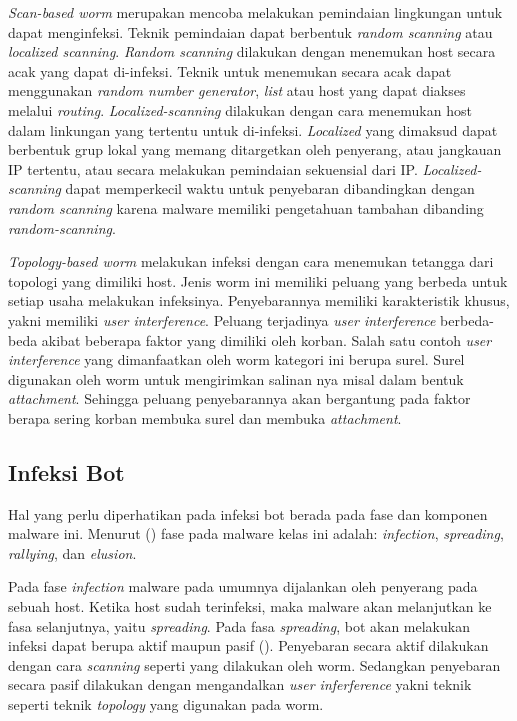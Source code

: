 \textit{Scan-based worm} merupakan mencoba melakukan pemindaian lingkungan untuk dapat menginfeksi. Teknik pemindaian dapat berbentuk \textit{random scanning} atau \textit{localized scanning}. \textit{Random scanning} dilakukan dengan menemukan host secara acak yang dapat di-infeksi. Teknik untuk menemukan secara acak dapat menggunakan \textit{random number generator}, \textit{list} atau host yang dapat diakses melalui \textit{routing}. \textit{Localized-scanning} dilakukan dengan cara menemukan host dalam linkungan yang tertentu untuk di-infeksi. \textit{Localized} yang dimaksud dapat berbentuk grup lokal yang memang ditargetkan oleh penyerang, atau jangkauan IP tertentu, atau secara melakukan pemindaian sekuensial dari IP. \textit{Localized-scanning} dapat memperkecil waktu untuk penyebaran dibandingkan dengan \textit{random scanning} karena malware memiliki pengetahuan tambahan dibanding \textit{random-scanning}.

\textit{Topology-based worm} melakukan infeksi dengan cara menemukan tetangga dari topologi yang dimiliki host. Jenis worm ini memiliki peluang yang berbeda untuk setiap usaha melakukan infeksinya. Penyebarannya memiliki karakteristik khusus, yakni memiliki \textit{user interference}. Peluang terjadinya \textit{user interference} berbeda-beda akibat beberapa faktor yang dimiliki oleh korban. Salah satu contoh \textit{user interference} yang dimanfaatkan oleh worm kategori ini berupa surel. Surel digunakan oleh worm untuk mengirimkan salinan nya misal dalam bentuk \textit{attachment}. Sehingga peluang penyebarannya akan bergantung pada faktor berapa sering korban membuka surel dan membuka \textit{attachment}.

\subsection{Infeksi Bot}

Hal yang perlu diperhatikan pada infeksi bot berada pada fase dan komponen malware ini. Menurut (\cite{alsamer2016}) fase pada malware kelas ini adalah: \textit{infection}, \textit{spreading}, \textit{rallying}, dan \textit{elusion}.

Pada fase \textit{infection} malware pada umumnya dijalankan oleh penyerang pada sebuah host. Ketika host sudah terinfeksi, maka malware akan melanjutkan ke fasa selanjutnya, yaitu \textit{spreading}. Pada fasa \textit{spreading}, bot akan melakukan infeksi dapat berupa aktif maupun pasif (\cite{alsamer2016}). Penyebaran secara aktif dilakukan dengan cara \textit{scanning} seperti yang dilakukan oleh worm. Sedangkan penyebaran secara pasif dilakukan dengan mengandalkan \textit{user inferference} yakni teknik seperti teknik \textit{topology} yang digunakan pada worm.


